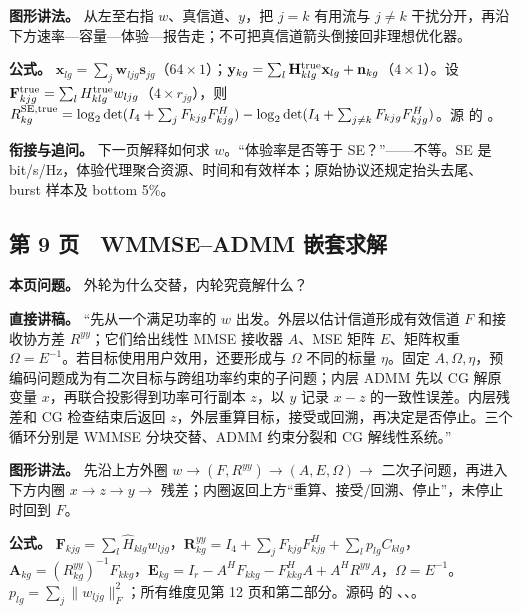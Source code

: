 \documentclass[11pt,a4paper]{ctexart}
\begin{document}
\textbf{图形讲法。} 从左至右指 $w$、真信道、$y$，把 $j=k$ 有用流与 $j\ne k$ 干扰分开，再沿下方速率—容量—体验—报告走；不可把真信道箭头倒接回非理想优化器。\par

\textbf{公式。} $\mathbf x_{lg}=\sum_j\mathbf w_{ljg}\mathbf s_{jg}$（$64\times1$）；$\mathbf y_{kg}=\sum_l\mathbf H^{\rm true}_{klg}\mathbf x_{lg}+\mathbf n_{kg}$（$4\times1$）。设 $\mathbf F^{\rm true}_{kjg}=\sum_lH^{\rm true}_{klg}w_{ljg}$（$4\times r_{jg}$），则 $R^{\rm SE,true}_{kg}=\log_2\det(I_4+\sum_jF_{kjg}F_{kjg}^H)-\log_2\det(I_4+\sum_{j\ne k}F_{kjg}F_{kjg}^H)$。源  的 。\par

\textbf{衔接与追问。} 下一页解释如何求 $w$。“体验率是否等于 SE？”——不等。SE 是 bit/s/Hz，体验代理聚合资源、时间和有效样本；原始协议还规定抬头去尾、burst 样本及 bottom 5\%。\par

\subsection*{第 9 页　WMMSE–ADMM 嵌套求解}

\textbf{本页问题。} 外轮为什么交替，内轮究竟解什么？\par

\textbf{直接讲稿。} “先从一个满足功率的 $w$ 出发。外层以估计信道形成有效信道 $F$ 和接收协方差 $R^{yy}$；它们给出线性 MMSE 接收器 $A$、MSE 矩阵 $E$、矩阵权重 $\Omega=E^{-1}$。若目标使用用户效用，还要形成与 $\Omega$ 不同的标量 $\eta$。固定 $A,\Omega,\eta$，预编码问题成为有二次目标与跨组功率约束的子问题；内层 ADMM 先以 CG 解原变量 $x$，再联合投影得到功率可行副本 $z$，以 $y$ 记录 $x-z$ 的一致性误差。内层残差和 CG 检查结束后返回 $z$，外层重算目标，接受或回溯，再决定是否停止。三个循环分别是 WMMSE 分块交替、ADMM 约束分裂和 CG 解线性系统。”\par

\textbf{图形讲法。} 先沿上方外圈 $w\to(F,R^{yy})\to(A,E,\Omega)\to$ 二次子问题，再进入下方内圈 $x\to z\to y\to$ 残差；内圈返回上方“重算、接受/回溯、停止”，未停止时回到 $F$。\par

\textbf{公式。} $\mathbf F_{kjg}=\sum_l\widehat H_{klg}w_{ljg}$，$\mathbf R^{yy}_{kg}=I_4+\sum_jF_{kjg}F_{kjg}^H+\sum_l p_{lg}C_{klg}$，$\mathbf A_{kg}=(R^{yy}_{kg})^{-1}F_{kkg}$，$\mathbf E_{kg}=I_r-A^HF_{kkg}-F_{kkg}^HA+A^HR^{yy}A$，$\Omega=E^{-1}$。$p_{lg}=\sum_j\|w_{ljg}\|_F^2$；所有维度见第 12 页和第二部分。源码  的 、、。\par
\end{document}
